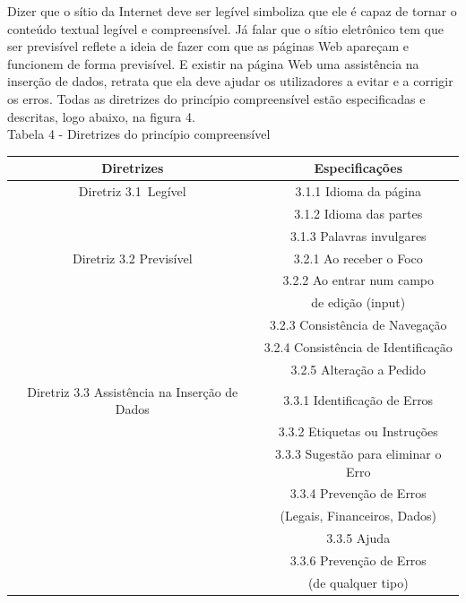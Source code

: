 \documentclass[a4paper]{article}
\begin{document}
\begin{titlepage}
Dizer que o sítio da Internet deve ser legível simboliza que ele é capaz de tornar o conteúdo textual legível e compreensível. Já falar que o sítio eletrônico tem que ser previsível reflete a ideia de fazer com que as páginas Web apareçam e funcionem de forma previsível. E existir na página Web uma assistência na inserção de dados, retrata que ela deve ajudar os utilizadores a evitar e a corrigir os erros. Todas as diretrizes do princípio compreensível estão especificadas e descritas, logo abaixo, na figura 4.\\

Tabela 4 - Diretrizes do princípio compreensível\\
\begin{center}
	\fontsize{8pt}{8pt}\selectfont
	\begin{tabular}{|cc|}
		\hline
		Diretrizes & Especificações \\
		\hline
		Diretriz 3.1 Legível& 3.1.1 Idioma da página\\
		& 3.1.2 Idioma das partes\\
		& 3.1.3 Palavras invulgares\\
		\hline
		Diretriz 3.2 Previsível & 3.2.1 Ao receber o Foco\\
		& 3.2.2 Ao entrar num campo\\
		& de edição (input)\\
		& 3.2.3 Consistência de Navegação\\
		& 3.2.4 Consistência de Identificação\\
		& 3.2.5 Alteração a Pedido\\
		\hline
		Diretriz 3.3 Assistência na Inserção de Dados& 3.3.1 Identificação de Erros\\
		& 3.3.2 Etiquetas ou Instruções\\
		& 3.3.3 Sugestão para eliminar o Erro\\
		& 3.3.4 Prevenção de Erros\\
		& (Legais, Financeiros, Dados)\\
		& 3.3.5 Ajuda\\
		& 3.3.6 Prevenção de Erros\\
		& (de qualquer tipo)\\
		\hline
	\end{tabular}
\end{center}

\end{titlepage}
\end{document}
